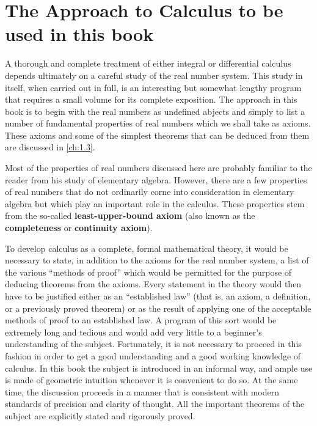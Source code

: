 \section{The Approach to Calculus to be used in this book}\label{sec:1.1.6}

\begin{note}
  A thorough and complete treatment of either integral or differential calculus depends ultimately on a careful study of the real number system.
  This study in itself, when carried out in full, is an interesting but somewhat lengthy program that requires a small volume for its complete exposition.
  The approach in this book is to begin with the real numbers as undefined abjects and simply to list a number of fundamental properties of real numbers which we shall take as axioms.
  These axioms and some of the simplest theorems that can be deduced from them are discussed in \cref{ch:1.3}.

  Most of the properties of real numbers discussed here are probably familiar to the reader from his study of elementary algebra.
  However, there are a few properties of real numbers that do not ordinarily corne into consideration in elementary algebra but which play an important role in the calculus.
  These properties stem from the so-called \textbf{least-upper-bound axiom} (also known as the \textbf{completeness} or \textbf{continuity axiom}).

  To develop calculus as a complete, formal mathematical theory, it would be necessary to state, in addition to the axioms for the real number system, a list of the various ``methods of proof'' which would be permitted for the purpose of deducing theorems from the axioms.
  Every statement in the theory would then have to be justified either as an ``established law''
  (that is, an axiom, a definition, or a previously proved theorem) or as the result of applying one of the acceptable methods of proof to an established law.
  A program of this sort would be extremely long and tedious and would add very little to a beginner's understanding of the subject.
  Fortunately, it is not necessary to proceed in this fashion in order to get a good understanding and a good working knowledge of calculus.
  In this book the subject is introduced in an informal way, and ample use is made of geometric intuition whenever it is convenient to do so.
  At the same time, the discussion proceeds in a manner that is consistent with modern standards of precision and clarity of thought.
  All the important theorems of the subject are explicitly stated and rigorously proved.
\end{note}
